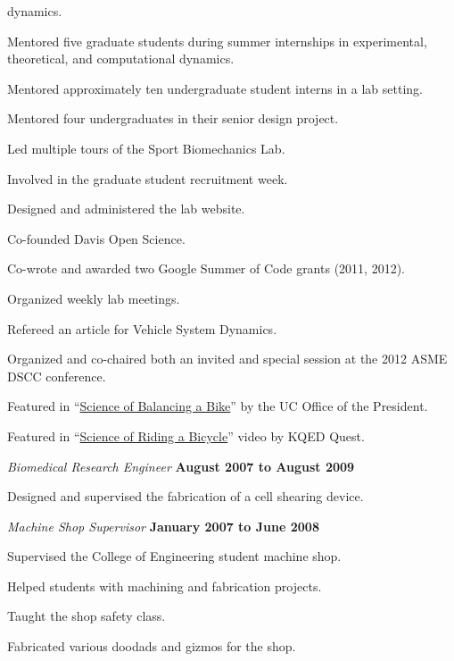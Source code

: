 \documentclass[10pt]{article}
\newenvironment{outerlist}[1][\enskip\textbullet]%
        {\begin{itemize}[#1]}{\end{itemize}%
         \vspace{-.6\baselineskip}}
\newenvironment{innerlist}[1][\enskip\textbullet]%
        {\begin{compactitem}[#1]}{\end{compactitem}}
\begin{document}
\begin{outerlist}
\begin{innerlist}
        dynamics.
    \item Mentored five graduate students during summer internships in
      experimental, theoretical, and computational dynamics.
    \item Mentored approximately ten undergraduate student interns in a lab
      setting.
    \item Mentored four undergraduates in their senior design project.
    \item Led multiple tours of the Sport Biomechanics Lab.
    \item Involved in the graduate student recruitment week.
    \item Designed and administered the lab website.
    \item Co-founded Davis Open Science.
    \item Co-wrote and awarded two Google Summer of Code grants (2011, 2012).
    \item Organized weekly lab meetings.
    \item Refereed an article for Vehicle System Dynamics.
    \item Organized and co-chaired both an invited and special session at the
      2012 ASME DSCC conference.
    \item Featured in ``\href{http://youtu.be/HcYbn_RCLiw}{Science of
      Balancing a Bike}'' by the UC Office of the President.
    \item Featured in ``\href{http://youtu.be/zShn5xMueso}{Science of Riding a
      Bicycle}'' video by KQED Quest.
  \end{innerlist}
  \item[] \textit{Biomedical Research Engineer}%
        \hfill \textbf{August 2007 to August 2009}
  \begin{innerlist}
    \item Designed and supervised the fabrication of a cell shearing device.
  \end{innerlist}
  \item[] \textit{Machine Shop Supervisor}%
    \hfill \textbf{January 2007 to June 2008}
  \begin{innerlist}
    \item Supervised the College of Engineering student machine shop.
    \item Helped students with machining and fabrication projects.
    \item Taught the shop safety class.
    \item Fabricated various doodads and gizmos for the shop.

\end{innerlist}
\end{outerlist}
\end{document}
